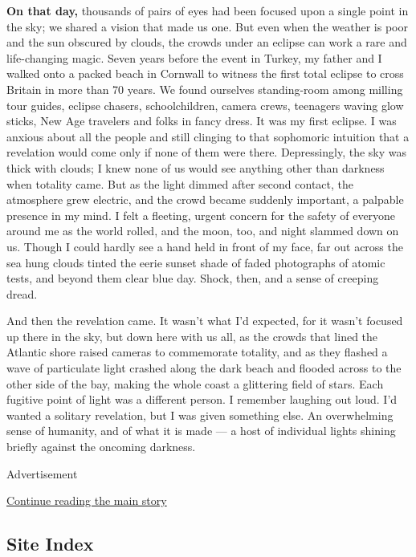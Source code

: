 \textbf{On that day,} thousands of pairs of eyes had been focused upon a
single point in the sky; we shared a vision that made us one. But even
when the weather is poor and the sun obscured by clouds, the crowds
under an eclipse can work a rare and life-changing magic. Seven years
before the event in Turkey, my father and I walked onto a packed beach
in Cornwall to witness the first total eclipse to cross Britain in more
than 70 years. We found ourselves standing-room among milling tour
guides, eclipse chasers, schoolchildren, camera crews, teenagers waving
glow sticks, New Age travelers and folks in fancy dress. It was my first
eclipse. I was anxious about all the people and still clinging to that
sophomoric intuition that a revelation would come only if none of them
were there. Depressingly, the sky was thick with clouds; I knew none of
us would see anything other than darkness when totality came. But as the
light dimmed after second contact, the atmosphere grew electric, and the
crowd became suddenly important, a palpable presence in my mind. I felt
a fleeting, urgent concern for the safety of everyone around me as the
world rolled, and the moon, too, and night slammed down on us. Though I
could hardly see a hand held in front of my face, far out across the sea
hung clouds tinted the eerie sunset shade of faded photographs of atomic
tests, and beyond them clear blue day. Shock, then, and a sense of
creeping dread.

And then the revelation came. It wasn't what I'd expected, for it wasn't
focused up there in the sky, but down here with us all, as the crowds
that lined the Atlantic shore raised cameras to commemorate totality,
and as they flashed a wave of particulate light crashed along the dark
beach and flooded across to the other side of the bay, making the whole
coast a glittering field of stars. Each fugitive point of light was a
different person. I remember laughing out loud. I'd wanted a solitary
revelation, but I was given something else. An overwhelming sense of
humanity, and of what it is made --- a host of individual lights shining
briefly against the oncoming darkness.

Advertisement

\protect\hyperlink{after-bottom}{Continue reading the main story}

\hypertarget{site-index}{%
\subsection{Site Index}\label{site-index}}

